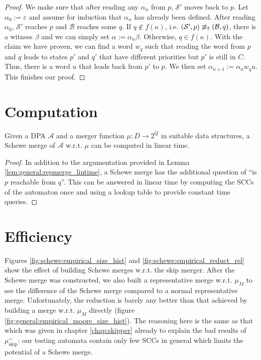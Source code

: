 \begin{proof}
	We make sure that after reading any $\alpha_n$ from $p$, $\mathcal{S}'$ moves back to $p$. Let $\alpha_0 := \varepsilon$ and assume for induction that $\alpha_n$ has already been defined. After reading $\alpha_0$, $\mathcal{S}'$ reaches $p$ and $\mathcal{B}$ reaches some $q$. If $q \notin f(\kappa)$, i.e. $(\mathcal{S}', p) \not\equiv_\text{\Ankh} (\mathcal{B}, q)$, there is a witness $\beta$ and we can simply set $\alpha := \alpha_n \beta$. Otherwise, $q \in f(\kappa)$. With the claim we have proven, we can find a word $w_q$ such that reading the word from $p$ and $q$ leads to states $p'$ and $q'$ that have different priorities but $p'$ is still in $C$. Thus, there is a word $u$ that leads back from $p'$ to $p$. We then set $\alpha_{n+1} := \alpha_n w_q u$. This finishes our proof.
\end{proof}



\section{Computation}
\begin{lem}
	Given a DPA $\mathcal{A}$ and a merger function $\mu : D \rightarrow 2^Q$ in suitable data structures, a Schewe merge of $\mathcal{A}$ w.r.t. $\mu$ can be computed in linear time.
\end{lem}

\begin{proof}
	In addition to the argumentation provided in Lemma \ref{lem:general:repmerge_lintime}, a Schewe merge has the additional question of \enquote{is $p$ reachable from $q$}. This can be answered in linear time by computing the SCCs of the automaton once and using a lookup table to provide constant time queries.
\end{proof}



\section{Efficiency}
Figures \ref{fig:schewe:empirical_size_hist} and \ref{fig:schewe:empirical_reduct_rel} show the effect of building Schewe merges w.r.t. the skip merger. After the Schewe merge was constructed, we also built a representative merge w.r.t. $\mu_M$ to see the difference of the Schewe merge compared to a normal representative merge. Unfortunately, the reduction is barely any better than that achieved by building a merge w.r.t. $\mu_M$ directly (figure \ref{fig:general:empirical_moore_size_hist}). The reasoning here is the same as that which was given in chapter \ref{chap:skipper} already to explain the bad results of $\mu_\text{skip}^\sim$: our testing automata contain only few SCCs in general which limits the potential of a Schewe merge.



